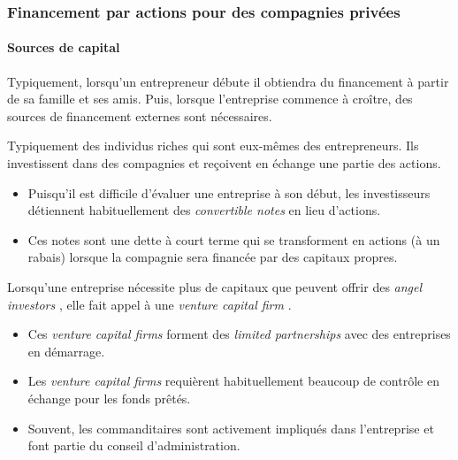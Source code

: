 \documentclass[10pt, french]{article}
\begin{document}
\begin{multicols*}{2}
\subsubsection{Financement par actions pour des compagnies privées}
\paragraph{Sources de capital}
\begin{rappel_enhanced}[Contexte]
Typiquement, lorsqu'un entrepreneur débute il obtiendra du financement à partir de sa famille et ses amis. Puis, lorsque l'entreprise commence à croître, des sources de financement externes sont nécessaires.
\end{rappel_enhanced}

\begin{definitionNOHFILLsub}
Typiquement des individus riches qui sont eux-mêmes des entrepreneurs. Ils investissent dans des compagnies et reçoivent en échange une partie des actions.
\begin{itemize}
	\item	Puisqu'il est difficile d'évaluer une entreprise à son début, les investisseurs détiennent habituellement des \og \textit{convertible notes} \fg{} en lieu d'actions.
	\item	Ces notes sont une dette à court terme qui se transforment en actions (à un rabais) lorsque la compagnie sera financée par des capitaux propres.
\end{itemize}
\end{definitionNOHFILLsub}

\begin{definitionNOHFILLsub}
Lorsqu'une entreprise nécessite plus de capitaux que peuvent offrir des \og \textit{angel investors} \fg{}, elle fait appel à une \og \textit{venture capital firm} \fg{}.
\begin{itemize}
	\item	Ces \og \textit{venture capital firms} \fg{} forment des \og \textit{limited partnerships} \fg{} avec des entreprises en démarrage.
	\item	Les \og \textit{venture capital firms} requièrent habituellement beaucoup de contrôle en échange pour les fonds prêtés.
	\item	Souvent, les commanditaires sont activement impliqués dans l'entreprise et font partie du conseil d'administration.
\end{itemize}
\end{definitionNOHFILLsub}


\end{multicols*}
\end{document}
